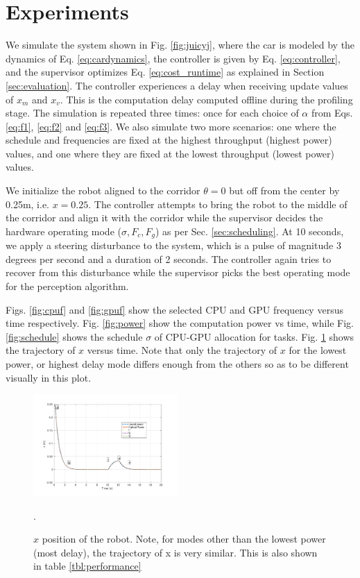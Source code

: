 \section{Experiments}
\label{sec:simResults}

We simulate the system shown in Fig. \ref{fig:juicyj}, where the car is modeled by the dynamics of Eq. \eqref{eq:cardynamics}, the controller is given by Eq. \eqref{eq:controller}, and the supervisor optimizes Eq. \ref{eq:cost_runtime} as explained in Section \ref{sec:evaluation}. 
The controller experiences a delay when receiving update values of $x_m$ and $x_v$. 
This is the computation delay computed offline during the profiling stage. 
The simulation is repeated three times: once for each choice of $\alpha$ from Eqs. \eqref{eq:f1}, \eqref{eq:f2} and \eqref{eq:f3}.
We also simulate two more scenarios: one where the schedule and frequencies are fixed at the highest throughput (highest power) values, and one where they are fixed at the lowest throughput (lowest power) values.

We initialize the robot aligned to the corridor $\theta=0$ but off from the center by 0.25m, i.e. $x=0.25$. 
The controller attempts to bring the robot to the middle of the corridor and align it with the corridor while the supervisor decides the hardware operating mode ($\sigma,F_c,F_g$) as per Sec. \ref{sec:scheduling}. 
At 10 seconds, we apply a steering disturbance to the system, which is a pulse of magnitude 3 degrees per second and a duration of 2 seconds. 
The controller again tries to recover from this disturbance while the supervisor picks the best operating mode for the perception algorithm. 

Figs. \ref{fig:cpuf} and \ref{fig:gpuf} show the selected CPU and GPU frequency versus time respectively. 
Fig. \ref{fig:power} show the computation power vs time, while Fig. \ref{fig:schedule} shows the schedule $\sigma$ of CPU-GPU allocation for tasks.
Fig. \ref{fig:xvst} shows the trajectory of $x$ versus time.  
Note that only the trajectory of $x$ for the lowest power, or highest delay mode differs enough from the others so as to be different visually in this plot.


\begin{figure}[t]
\centering
\includegraphics[width=0.49\textwidth]{../simulations/figs/xvst.pdf}
\vspace{-20pt}
\caption{$x$ position of the robot. Note, for modes other than the lowest power (most delay), the trajectory of x is very similar. This is also shown in table \ref{tbl:performance}}.
\label{fig:xvst} 
\end{figure}

